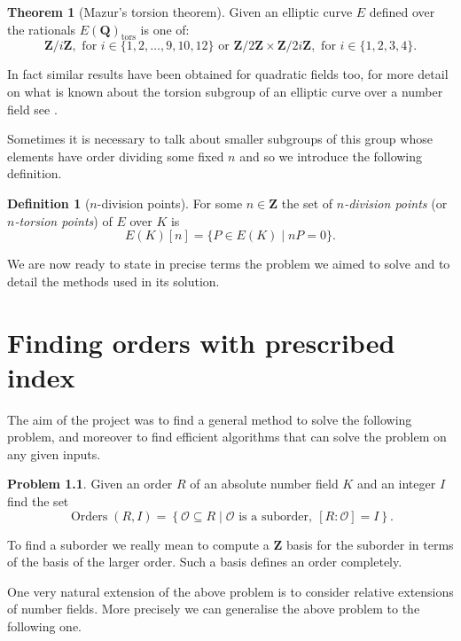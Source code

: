 \documentclass[12pt,a4paper,abstracton,bibtotoc]{scrreprt}
\theoremstyle{definition}
\newtheorem{thm}{Theorem}
\newtheorem{defn}{Definition}
\newtheorem{prob}{Problem}
\newcommand{\QQ}{\mathbf{Q}}
\newcommand{\ZZ}{\mathbf{Z}}
\renewcommand{\O}{\mathcal{O}}
\DeclareMathOperator{\Orders}{Orders}
\begin{document}
\begin{thm}[Mazur's torsion theorem]
\label{thm:tors}
Given an elliptic curve $E$ defined over the rationals $E(\QQ)_\text{tors}$ is one of:
\[
\ZZ/i\ZZ,\text{ for } i \in\{1,2,\ldots,9,10,12\}\text{ or }
\ZZ/2\ZZ \times \ZZ/2i\ZZ,\text{ for } i \in\{1,2,3,4\}.
\]
\end{thm}

In fact similar results have been obtained for quadratic fields too, for more detail on what is known about the torsion subgroup of an elliptic curve over a number field see \cite{sutherland}.

Sometimes it is necessary to talk about smaller subgroups of this group whose elements have order dividing some fixed $n$ and so we introduce the following definition.
\begin{defn}[$n$-division points]
For some $n\in\ZZ$ the set of \emph{$n$-division points} (or \emph{$n$-torsion points}) of $E$ over $K$ is
\[
E(K)[n] = \{P\in E(K) \mid nP = 0\}.
\]
\end{defn}

\minisec{}
We are now ready to state in precise terms the problem we aimed to solve and to detail the methods used in its solution.


\chapter{Finding orders with prescribed index}
\label{chap:prob}

The aim of the project was to find a general method to solve the following problem, and moreover to find efficient algorithms that can solve the problem on any given inputs.

\begin{prob}
Given an order $R$ of an absolute number field $K$ and an integer $I$ find the set
\[
\Orders(R,I) = \left\{ \O\subseteq R \mid \O\text{ is a suborder},\ [R:\O] = I\right\}.
\]
\end{prob}

To find a suborder we really mean to compute a $\ZZ$ basis for the suborder in terms of the basis of the larger order.
Such a basis defines an order completely.

\minisec{}
One very natural extension of the above problem is to consider relative extensions of number fields.
More precisely we can generalise the above problem to the following one.
\end{document}
